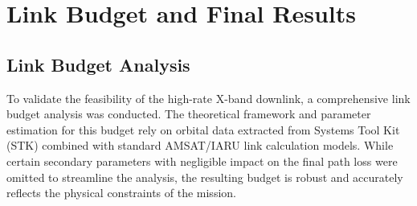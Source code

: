 \chapter{Link Budget and Final Results} \label{ch:Link}

\section{Link Budget Analysis}

To validate the feasibility of the high-rate X-band downlink, a comprehensive link budget analysis was conducted. The theoretical framework and parameter estimation for this budget rely on orbital data extracted from Systems Tool Kit (STK) combined with standard AMSAT/IARU link calculation models. While certain secondary parameters with negligible impact on the final path loss were omitted to streamline the analysis, the resulting budget is robust and accurately reflects the physical constraints of the mission.


